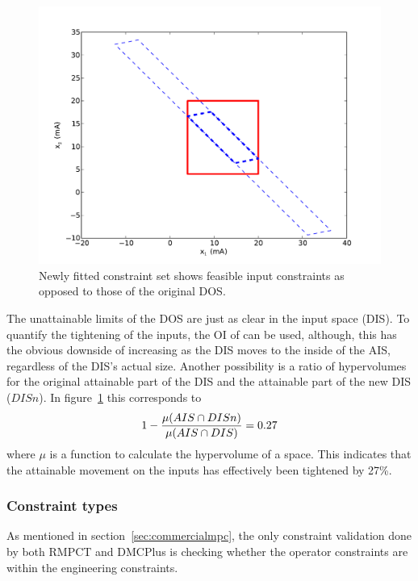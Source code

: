 \begin{figure}[htbp]
  \centering
    \includegraphics[width=\fullwidth]{graph/flowconsinput.pdf}
  \caption[AIS, DIS and newly fitted DIS of level and flow rig]{Newly fitted constraint set shows feasible input constraints as opposed to those of the original DOS.}
  \label{fig:flowconsinput}
\end{figure}

The unattainable limits of the DOS are just as clear in the input space (DIS).
To quantify the tightening of the inputs, the OI of \citet{vinsonphd} can be used, although, this has the obvious downside of increasing as the DIS moves to the inside of the AIS, regardless of the DIS's actual size.
Another possibility is a ratio of hypervolumes for the original attainable part of the DIS and the attainable part of the new DIS ($DISn$).
In figure~\ref{fig:flowconsinput} this corresponds to
\begin{equation}
  \label{eq:inputclamp}
  1-\frac{\mu(AIS \cap DISn)}{\mu(AIS \cap DIS)} = 0.27 \notag
\end{equation}
where $\mu$ is a function to calculate the hypervolume of a space.
This indicates that the attainable movement on the inputs has effectively been tightened by 27\%. 

\subsubsection{Constraint types}
As mentioned in section~\ref{sec:commercialmpc}, the only constraint validation done by both RMPCT and DMCPlus is checking whether the operator constraints are within the engineering constraints.

